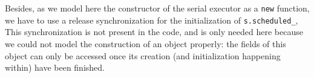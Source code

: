 Besides, as we model here the constructor of the serial executor as a \texttt{new} function, we have to use a release synchronization for the initialization of \texttt{s.scheduled\_}, This synchronization is not present in the code, and is only needed here because we could not model the construction of an object properly: the fields of this object can only be accessed once its creation (and initialization happening within) have been finished.

